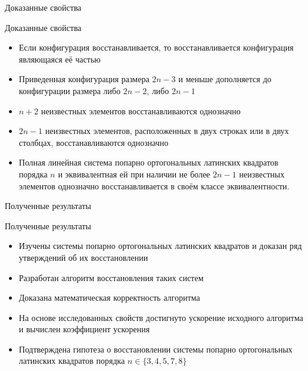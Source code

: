 \documentclass[8pt, hyperref={pdftex,unicode}, green]{beamer}
\begin{document}
\begin{frame}{Доказанные свойства}

    \begin{block}{Доказанные свойства}
        \begin{itemize}
            \item Если конфигурация восстанавливается, то восстанавливается конфигурация являющаяся её частью
            \item Приведенная конфигурация размера $2n-3$ и меньше дополняется до конфигурации размера либо $2n-2$, либо $2n-1$
            \item $n+2$ неизвестных элементов восстанавливаются однозначно
            \item $2n-1$ неизвестных элементов, расположенных в двух строках или в двух столбцах, восстанавливаются однозначно
            \item Полная линейная система попарно ортогональных латинских квадратов порядка $n$ и эквивалентная ей при наличии не более $2n - 1$ неизвестных элементов однозначно восстанавливается в своём классе эквивалентности.
        \end{itemize}
    \end{block}
  
\end{frame} 


\begin{frame}{Полученные результаты}

    \begin{block}{Полученные результаты}
        \begin{itemize}
            \item Изучены системы попарно ортогональных латинских квадратов и доказан ряд утверждений об их восстановлении
            \item Разработан алгоритм восстановления таких систем
            \item Доказана математическая корректность алгоритма
            \item На основе исследованных свойств достигнуто ускорение исходного алгоритма и вычислен коэффициент ускорения
            \item Подтверждена гипотеза о восстановлении системы попарно ортогональных латинских квадратов порядка $n\in\{3,4,5,7,8\}$
        \end{itemize}
    \end{block}
  
\end{frame} 
\end{document}
